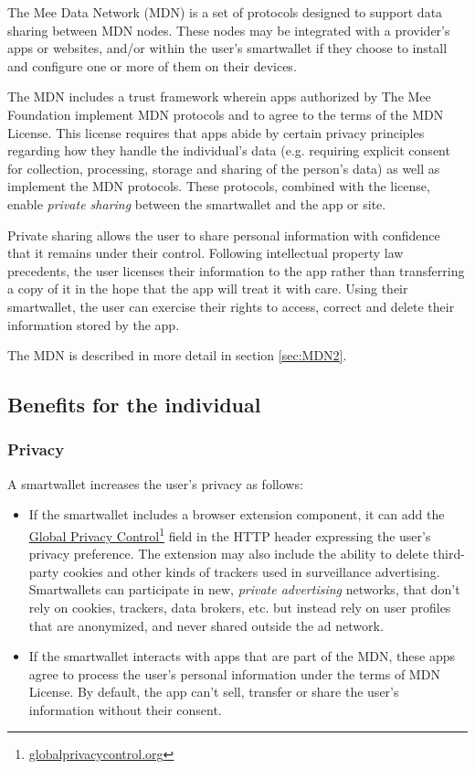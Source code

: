 \documentclass[11pt, oneside]{article}   	%
\newcommand{\hyperfootnote}[1][]{\def\ArgI{{#1}}\hyperfootnoteRelay}
\newcommand\hyperfootnoteRelay[2][]{\href{#1#2}{\ArgI}\footnote{\href{#1#2}{#2}}}
\begin{document}
The Mee Data Network (MDN) is a set of protocols designed to support data sharing between MDN nodes. These nodes may be integrated with a provider's apps or websites, and/or within the user's smartwallet if they choose to install and configure one or more of them on their devices.

The MDN includes a trust framework wherein apps authorized by The Mee Foundation implement MDN protocols and to agree to the terms of the MDN License. This license requires that apps abide by certain privacy principles regarding how they handle the individual's data (e.g. requiring explicit consent for collection, processing, storage and sharing of the person's data) as well as implement the MDN protocols. These protocols, combined with the license, enable \emph{private sharing} between the smartwallet and the app or site. 

Private sharing allows the user to share personal information with confidence that it remains under their control. Following intellectual property law precedents, the user licenses their information to the app rather than transferring a copy of it in the hope that the app will treat it with care. Using their smartwallet, the user can exercise their rights to access, correct and delete their information stored by the app.

The MDN is described in more detail in section \ref{sec:MDN2}.

\subsection{Benefits for the individual}

\subsubsection{Privacy}

A smartwallet increases the user's privacy as follows:
\begin{itemize}
	\item If the smartwallet includes a browser extension component, it can add the \hyperfootnote[Global Privacy Control][https://]{globalprivacycontrol.org} field in the HTTP header expressing the user's privacy preference. The extension may also include the ability to delete third-party cookies and other kinds of trackers used in surveillance advertising. Smartwallets can participate in new, \emph{private advertising} networks, that don't rely on cookies, trackers, data brokers, etc. but instead rely on user profiles that are anonymized, and never shared outside the ad network. 
	\item If the smartwallet interacts with apps that are part of the MDN, these apps agree to process the user's personal information under the terms of MDN License. By default, the app can't sell, transfer or share the user's information without their consent. 
\end{itemize}
\end{document}
